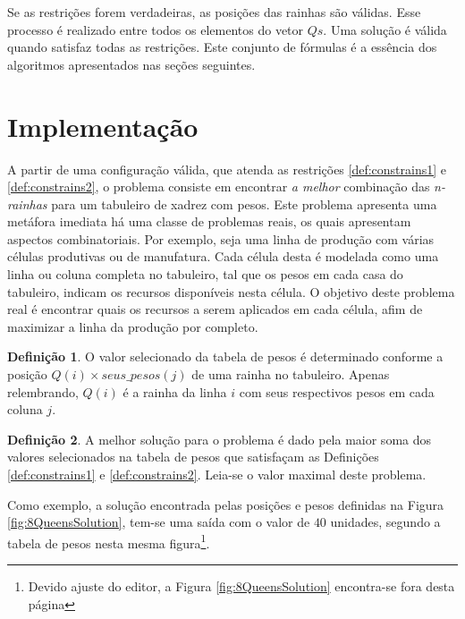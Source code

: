 \documentclass[12pt]{article}
\newcommand{\nrainhas}{\emph{n-rainhas }}
\theoremstyle{definition}
\newtheorem{defn}{Definição}[section]
\begin{document}
Se as restrições forem verdadeiras, as posições das rainhas
 são válidas. Esse processo é realizado entre todos os 
 elementos do vetor $Qs$. Uma solução é válida quando 
 satisfaz todas as restrições. Este conjunto de fórmulas 
 é a essência dos algoritmos apresentados nas seções seguintes.

\section{Implementação}\label{sec_implementacao}

A partir de uma configuração válida, que atenda as restrições \ref{def:constrains1} e \ref{def:constrains2},
 o problema consiste em encontrar {\em a melhor} combinação das \nrainhas para um tabuleiro de xadrez com pesos. Este problema apresenta uma metáfora imediata há uma classe de problemas reais, os quais apresentam aspectos combinatoriais. Por exemplo, seja uma linha de produção com várias células produtivas ou de manufatura. Cada célula desta é modelada como uma linha ou coluna completa no tabuleiro, tal que os pesos em cada casa do tabuleiro, indicam os recursos disponíveis nesta célula. O objetivo deste problema real é encontrar quais os recursos a serem aplicados em cada célula, afim de maximizar a linha da produção por completo.

\begin{defn}
\label{def:problem1}
O valor selecionado da tabela de pesos é determinado 
conforme a posição $Q(i) \times seus\_pesos(j) $ de uma rainha no tabuleiro. Apenas relembrando, $Q(i)$ é a rainha da linha $i$ com seus respectivos pesos em cada coluna $j$.
\end{defn}

\begin{defn}
\label{def:problem2}
A melhor solução para o problema é dado pela maior soma dos valores selecionados 
na tabela de pesos que satisfaçam as Definições \ref{def:constrains1} e \ref{def:constrains2}. 
Leia-se o valor maximal deste problema.
\end{defn}

Como exemplo, a solução encontrada pelas posições e pesos definidas na 
Figura \ref{fig:8QueensSolution}, tem-se uma saída com o valor de $40$ 
unidades, segundo a tabela de pesos nesta mesma figura\footnote{Devido 
ajuste do editor, a Figura \ref{fig:8QueensSolution}  encontra-se fora 
desta página}.
\end{document}
